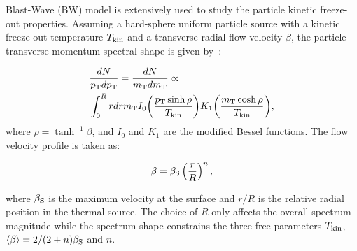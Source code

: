 \documentclass[%
 reprint,	
 amsmath,amssymb,
 aps,
 prc,
]{revtex4-1}
\begin{document}
Blast-Wave (BW) model is extensively used to study the particle kinetic freeze-out properties. Assuming a hard-sphere uniform particle source with a kinetic freeze-out temperature $T_{\rm kin}$ and a transverse radial flow velocity $\beta$, the particle transverse momentum spectral shape is given by~\cite{Schnedermann:1993ws}:

\begin{equation}
  \begin{aligned}
  & \frac{dN}{p_{\rm T}dp_{\rm T}} = \frac{dN}{m_{\rm T}dm_{\rm T}} \propto \\
  & \int_0^R rdr m_{\rm T} I_0\bigg(\frac{p_{\rm T}\sinh\rho}{T_{\rm kin}}\bigg) K_1\bigg(\frac{m_{\rm T}\cosh\rho}{T_{\rm kin}}\bigg),
  \end{aligned}
\label{equ:equation8}
\end{equation}
where $\rho = \tanh^{-1}\beta$, and $I_0$ and $K_1$ are the modified Bessel functions. The flow velocity profile is taken as:

\begin{equation}
  \begin{aligned}
\beta = \beta_{\rm S}\left(\frac{r}{R}\right)^{n},
  \end{aligned}
\label{equ:equation9}
\end{equation}

where $\beta_{\rm S}$ is the maximum velocity at the surface and $r/R$ is the relative radial position in the thermal source. The choice of $R$ only affects the overall spectrum magnitude while the spectrum shape constrains the three free parameters $T_{\rm kin}$, $\langle\beta\rangle=2/(2+n)\beta_{\rm S}$ and $n$.

%
\end{document}
